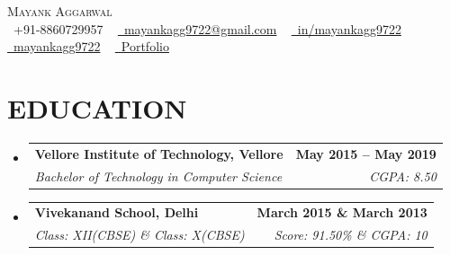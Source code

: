 \documentclass[letterpaper,11pt]{article}
\makeatletter
\newcommand{\resumeSubheading}[4]{
  \vspace{-2pt}\item
    \begin{tabular*}{1.0\textwidth}[t]{l@{\extracolsep{\fill}}r}
      \textbf{#1} & \textbf{\small #2} \\
      \textit{\small#3} & \textit{\small #4} \\
    \end{tabular*}\vspace{-7pt}
}
\newcommand{\resumeSubHeadingListStart}{\begin{itemize}[leftmargin=0.0in, label={}]}
\newcommand{\resumeSubHeadingListEnd}{\end{itemize}}
\makeatother
\begin{document}

\begin{center}
    {\Huge \scshape Mayank Aggarwal} \\ \vspace{1pt}
    \vspace{1pt}
    \small \raisebox{-0.1\height}\faPhone\ +91-8860729957 ~ \href{mailto:mayankagg9722@gmail.com}{\faEnvelope\  mayankagg9722@gmail.com} ~ 
    \href{https://in.linkedin.com/in/mayankagg9722}{\faLinkedin \ in/mayankagg9722}  ~
    \href{https://github.com/mayankagg9722}{\faGithub\ mayankagg9722} ~
    \href{https://mayankagg9722.github.io/}{\faGlobe\ Portfolio}
    \vspace{-8pt}
\end{center}

   \section{EDUCATION}
  \resumeSubHeadingListStart
    \resumeSubheading
      {Vellore Institute of Technology, Vellore}{May 2015 -- May 2019}
      {Bachelor of Technology in Computer Science}{CGPA: 8.50}
    \resumeSubheading
      {Vivekanand School, Delhi}{March 2015 \& March 2013}
      {Class: XII(CBSE) \& Class: X(CBSE)}{Score: 91.50\% \& CGPA: 10}
  \resumeSubHeadingListEnd
  
\end{document}
